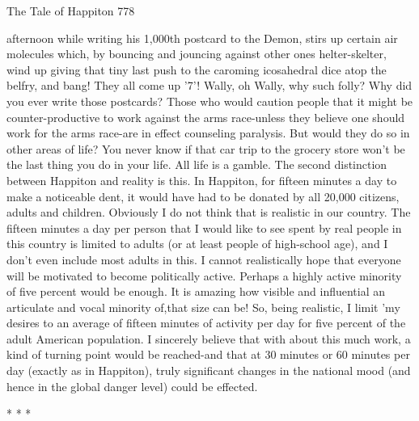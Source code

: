 The Tale of Happiton                                                                   778

afternoon while writing his 1,000th postcard to the Demon, stirs up certain air
molecules which, by bouncing and jouncing against other ones helter-skelter, wind up
giving that tiny last push to the caroming icosahedral dice atop the belfry, and bang!
They all come up '7'! Wally, oh Wally, why such folly? Why did you ever write those
postcards?
         Those who would caution people that it might be counter-productive to work
against the arms race-unless they believe one should work for the arms race-are in
effect counseling paralysis. But would they do so in other areas of life? You never
know if that car trip to the grocery store won't be the last thing you do in your life. All
life is a gamble.
         The second distinction between Happiton and reality is this. In Happiton, for
fifteen minutes a day to make a noticeable dent, it would have had to be donated by
all 20,000 citizens, adults and children. Obviously I do not think that is realistic in our
country. The fifteen minutes a day per person that I would like to see spent by real
people in this country is limited to adults (or at least people of high-school age), and I
don't even include most adults in this. I cannot realistically hope that everyone will be
motivated to become politically active. Perhaps a highly active minority of five
percent would be enough. It is amazing how visible and influential an articulate and
vocal minority of,that size can be! So, being realistic, I limit 'my desires to an average
of fifteen minutes of activity per day for five percent of the adult American
population. I sincerely believe that with about this much work, a kind of turning point
would be reached-and that at 30 minutes or 60 minutes per day (exactly as in
Happiton), truly significant changes in the national mood (and hence in the global
danger level) could be effected.

                                        *   *   *

